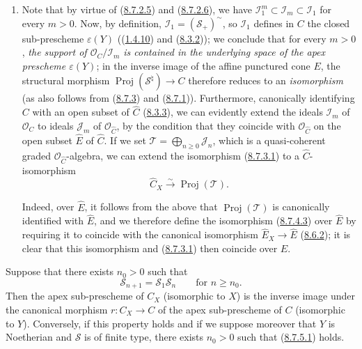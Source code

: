 \begin{remark}[8.7.4]
\begin{enumerate}
  \item[\rm{(ii)}] Note that by virtue of
  (\hyperref[II.8.7.2.5]{8.7.2.5}) and
  (\hyperref[II.8.7.2.6]{8.7.2.6}), we have
  $\mathcal{I}_1^m\subset\mathcal{I}_m\subset\mathcal{I}_1$ for every $m>0$.
  Now, by definition, $\mathcal{I}_1=(\mathcal{S}_+)^{\sim}$, so
  $\mathcal{I}_1$ defines in $C$ the closed sub-prescheme
  $\varepsilon(Y)$ ((\hyperref[II.1.4.10]{1.4.10}) and
  (\hyperref[II.8.3.2]{8.3.2})); we conclude that for every $m>0$,
  \emph{the support of $\mathcal{O}_C/\mathcal{I}_m$ is contained in the
  underlying space of the apex prescheme $\varepsilon(Y)$}; in the inverse
  image of the affine punctured cone $E$, the structural morphism
  $\operatorname{Proj}(\mathcal{S}^{\natural})\to C$ therefore reduces to an
  \emph{isomorphism} (as also follows from
  (\hyperref[II.8.7.3]{8.7.3}) and
  (\hyperref[II.8.7.1]{8.7.1})). Furthermore, canonically identifying $C$
  with an open subset of $\widehat{C}$ (\hyperref[II.8.3.3]{8.3.3}), we can
  evidently extend the ideals $\mathcal{I}_m$ of $\mathcal{O}_C$ to
  ideals $\mathcal{J}_m$ of $\mathcal{O}_{\widehat{C}}$, by the condition that
  they coincide with $\mathcal{O}_{\widehat{C}}$ on the open subset
  $\widehat{E}$ of $\widehat{C}$. If we set
  $\mathcal{T}=\bigoplus_{n\geqslant 0}\mathcal{J}_n$, which is a
  quasi-coherent graded $\mathcal{O}_{\widehat{C}}$-algebra, we can
  extend the isomorphism (\hyperref[II.8.7.3.1]{8.7.3.1}) to a
  $\widehat{C}$-isomorphism
  \begin{equation}
  \label{II.8.7.4.3}
    \widehat{C}_X\xrightarrow{\sim}\operatorname{Proj}(\mathcal{T}).
  \tag{8.7.4.3}
  \end{equation}

  Indeed, over $\widehat{E}$, it follows from the above that
  $\operatorname{Proj}(\mathcal{T})$ is canonically identified with
  $\widehat{E}$, and we therefore define the isomorphism
  (\hyperref[II.8.7.4.3]{8.7.4.3}) over $\widehat{E}$ by requiring
  it to coincide with the canonical isomorphism
  $\widehat{E}_X\to\widehat{E}$ (\hyperref[II.8.6.2]{8.6.2}); it is clear
  that this isomorphism and (\hyperref[II.8.7.3.1]{8.7.3.1}) then coincide
  over $E$.
\end{enumerate}
\end{remark}

\begin{corollary}[8.7.5]
\label{II.8.7.5}
Suppose that there exists $n_0>0$ such that
\begin{equation}
\label{II.8.7.5.1}
  \mathcal{S}_{n+1}=\mathcal{S}_1\mathcal{S}_n
  \qquad\text{for }n\geqslant n_0.
\tag{8.7.5.1}
\end{equation}
Then the apex sub-prescheme of $C_X$ (isomorphic to $X$) is the inverse
image under the canonical morphism $r:C_X\to C$ of the apex sub-prescheme
of $C$ (isomorphic to $Y$). Conversely, if this property holds and if we
suppose moreover that $Y$ is Noetherian and $\mathcal{S}$ is of finite type,
there exists $n_0>0$ such that \textup{(\hyperref[II.8.7.5.1]{8.7.5.1})} holds.
\end{corollary}

